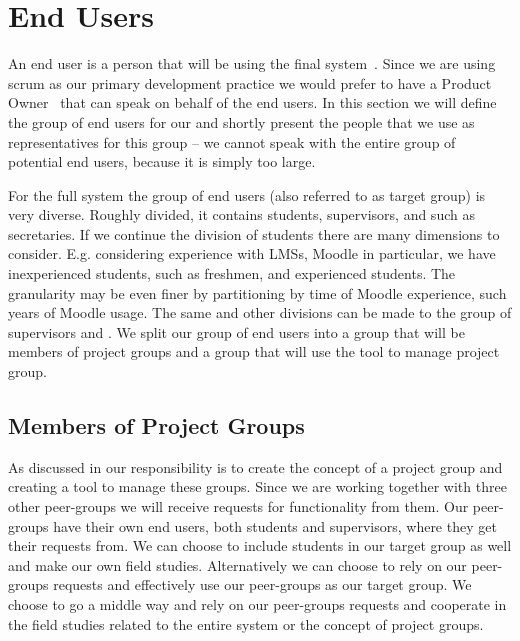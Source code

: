 \section{End Users}
\label{sec:enduser}
An end user is a person that will be using the final system~\cite{Larman04}.
Since we are using scrum as our primary development practice we would prefer to have a Product Owner~\cite{Larman04} that can speak on behalf of the end users.
In this section we will define the group of end users for our \subsystem{} and shortly present the people that we use as representatives for this group -- we cannot speak with the entire group of potential end users, because it is simply too large.

For the full system the group of end users (also referred to as target group) is very diverse.
Roughly divided, it contains students, supervisors, and \admpers{} such as secretaries.
If we continue the division of students there are many dimensions to consider. 
E.g. considering experience with LMSs, Moodle in particular, we have inexperienced students, such as freshmen, and experienced students.
The granularity may be even finer by partitioning by time of Moodle experience, such years of Moodle usage.
The same and other divisions can be made to the group of supervisors and \admpers{}.
We split our group of end users into a group that will be members of project groups and a group that will use the tool to manage project group.

\subsection{Members of Project Groups}
As discussed in  our responsibility is to create the concept of a project group and creating a tool to manage these groups.
Since we are working together with three other peer-groups we will receive requests for functionality from them.
Our peer-groups have their own end users, both students and supervisors, where they get their requests from.
We can choose to include students in our target group as well and make our own field studies.
Alternatively we can choose to rely on our peer-groups requests and effectively use our peer-groups as our target group.
We choose to go a middle way and rely on our peer-groups requests and cooperate in the field studies related to the entire system or the concept of project groups.

